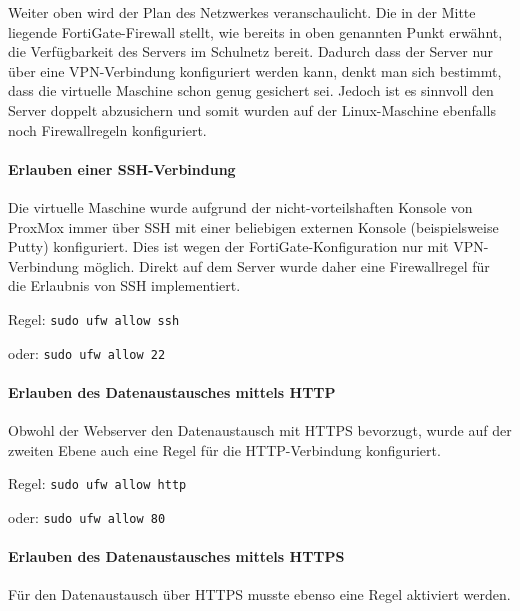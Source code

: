 Weiter oben  wird der Plan des
Netzwerkes veranschaulicht. Die in der Mitte liegende FortiGate-Firewall
stellt, wie bereits in oben genannten Punkt erwähnt, die Verfügbarkeit
des Servers im Schulnetz bereit. Dadurch dass der Server nur über eine
VPN-Verbindung konfiguriert werden kann, denkt man sich bestimmt, dass
die virtuelle Maschine schon genug gesichert sei. Jedoch ist es sinnvoll
den Server doppelt abzusichern und somit wurden auf der Linux-Maschine
ebenfalls noch Firewallregeln konfiguriert.

\hypertarget{erlauben-einer-ssh-verbindung}{%
\paragraph{Erlauben einer
SSH-Verbindung}\label{erlauben-einer-ssh-verbindung}}

Die virtuelle Maschine wurde aufgrund der nicht-vorteilshaften Konsole
von ProxMox immer über SSH mit einer beliebigen externen Konsole
(beispielsweise Putty) konfiguriert. Dies ist wegen der
FortiGate-Konfiguration nur mit VPN-Verbindung möglich. Direkt auf dem
Server wurde daher eine Firewallregel für die Erlaubnis von SSH
implementiert.

Regel: \texttt{sudo\ ufw\ allow\ ssh}

oder: \texttt{sudo\ ufw\ allow\ 22}

\hypertarget{erlauben-des-datenaustausches-mittels-http}{%
\paragraph{Erlauben des Datenaustausches mittels
HTTP}\label{erlauben-des-datenaustausches-mittels-http}}

Obwohl der Webserver den Datenaustausch mit HTTPS bevorzugt, wurde auf
der zweiten Ebene auch eine Regel für die HTTP-Verbindung konfiguriert.

Regel: \texttt{sudo\ ufw\ allow\ http}

oder: \texttt{sudo\ ufw\ allow\ 80}

\hypertarget{erlauben-des-datenaustausches-mittels-https}{%
\paragraph{Erlauben des Datenaustausches mittels
HTTPS}\label{erlauben-des-datenaustausches-mittels-https}}

Für den Datenaustausch über HTTPS musste ebenso eine Regel aktiviert
werden.

